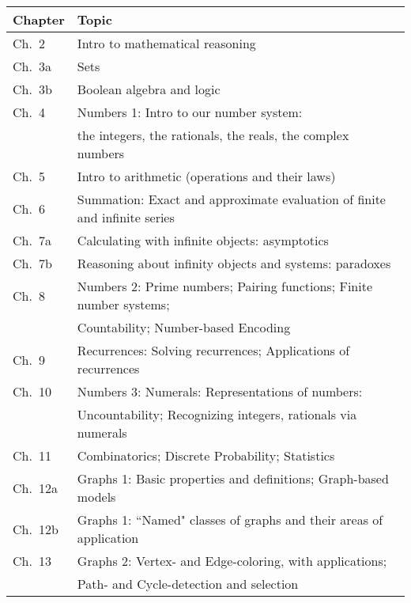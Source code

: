  \bigskip


\noindent
\begin{tabular}{|l|l|}
\hline
 {\bf Chapter} & {\bf Topic} \\
\hline
\hline
Ch.~2    & Intro to mathematical reasoning \\
Ch.~3a  & Sets \\
Ch.~3b  & Boolean algebra and logic \\
Ch.~4  & Numbers 1: Intro to our number system: \\
            & \hspace*{.67in}the integers, the rationals, the reals, the complex numbers \\
Ch.~5  &Intro to arithmetic (operations and their laws) \\
Ch.~6  & Summation: Exact and approximate evaluation of finite and infinite series   \\
Ch.~7a & Calculating with infinite objects: asymptotics \\
Ch.~7b  & Reasoning about infinity objects and systems: paradoxes \\
Ch.~8  & Numbers 2: Prime numbers; Pairing functions; Finite number systems; \\
            & \hspace*{.67in}Countability; Number-based Encoding  \\
Ch.~9  & Recurrences: Solving recurrences; Applications of recurrences \\
Ch.~10 & Numbers 3: Numerals: Representations of numbers: \\
             & \hspace*{.67in}Uncountability; Recognizing integers, rationals via numerals \\
Ch.~11  & Combinatorics; Discrete Probability; Statistics \\
Ch.~12a & Graphs 1: Basic properties and definitions; Graph-based models \\
Ch.~12b & Graphs 1: ``Named" classes of graphs and their areas of application \\
Ch.~13 & Graphs 2: Vertex- and Edge-coloring, with applications; \\
             & \hspace*{.67in}Path- and Cycle-detection and selection \\
\hline
\end{tabular}

\bigskip

